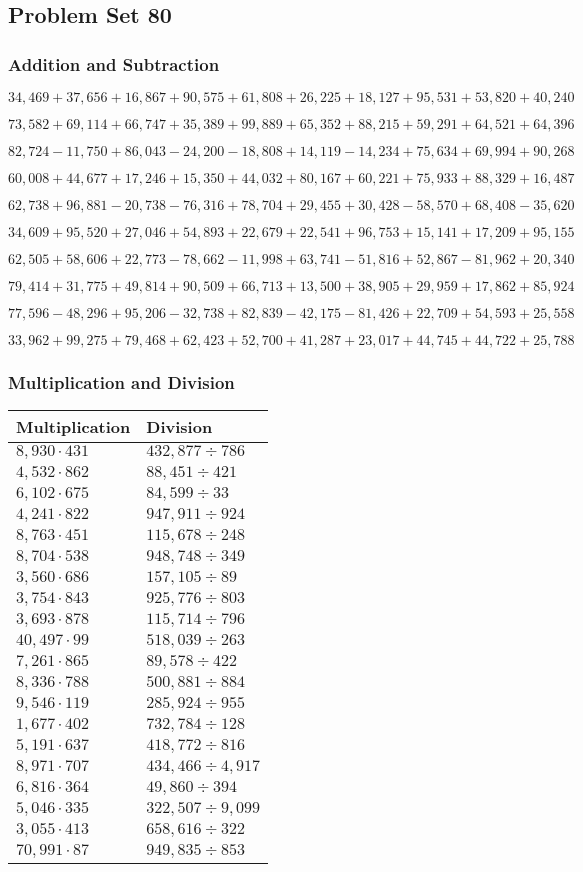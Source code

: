 \hypertarget{problem-set-80}{%
\subsection{Problem Set 80}\label{problem-set-80}}

\hypertarget{addition-and-subtraction-302}{%
\subsubsection{Addition and
Subtraction}\label{addition-and-subtraction-302}}

\(34,469+37,656+16,867+90,575+61,808+26,225+18,127+95,531+53,820+ 40,240\)

\(73,582+69,114+66,747+35,389+99,889+65,352+88,215+59,291+64,521+64,396\)

\(82,724-11,750+86,043-24,200-18,808+14,119-14,234+75,634+69,994+90,268\)

\(60,008+44,677+17,246+15,350+44,032+80,167+60,221+75,933+88,329+16,487\)

\(62,738+96,881-20,738-76,316+78,704+29,455+30,428-58,570+68,408-35,620\)

\(34,609+95,520+27,046+54,893+22,679+22,541+96,753+15,141+17,209+95,155\)

\(62,505+58,606+22,773-78,662-11,998+63,741-51,816+52,867-81,962+20,340\)

\(79,414+31,775+49,814+90,509+66,713+13,500+38,905+29,959+17,862+85,924\)

\(77,596-48,296+95,206-32,738+82,839-42,175-81,426+22,709+54,593+25,558\)

\(33,962+99,275+79,468+62,423+52,700+41,287+23,017+44,745+44,722+25,788\)

\hypertarget{multiplication-and-division-301}{%
\subsubsection{Multiplication and
Division}\label{multiplication-and-division-301}}

\begin{longtable}[]{@{}ll@{}}
\toprule
Multiplication & Division\tabularnewline
\midrule
\endhead
\(8,930\cdot431\) & \(432,877÷786\)\tabularnewline
\(4,532\cdot862\) & \(88,451÷421\)\tabularnewline
\(6,102\cdot675\) & \(84,599÷33\)\tabularnewline
\(4,241\cdot822\) & \(947,911÷924\)\tabularnewline
\(8,763\cdot451\) & \(115,678÷248\)\tabularnewline
\(8,704\cdot538\) & \(948,748÷349\)\tabularnewline
\(3,560\cdot686\) & \(157,105÷89\)\tabularnewline
\(3,754\cdot843\) & \(925,776÷803\)\tabularnewline
\(3,693\cdot878\) & \(115,714÷796\)\tabularnewline
\(40,497\cdot99\) & \(518,039÷263\)\tabularnewline
\(7,261\cdot865\) & \(89,578÷422\)\tabularnewline
\(8,336\cdot788\) & \(500,881÷884\)\tabularnewline
\(9,546\cdot119\) & \(285,924÷955\)\tabularnewline
\(1,677\cdot402\) & \(732,784÷128\)\tabularnewline
\(5,191\cdot637\) & \(418,772÷816\)\tabularnewline
\(8,971\cdot707\) & \(434,466÷4,917\)\tabularnewline
\(6,816\cdot364\) & \(49,860÷394\)\tabularnewline
\(5,046\cdot335\) & \(322,507÷9,099\)\tabularnewline
\(3,055\cdot413\) & \(658,616÷322\)\tabularnewline
\(70,991\cdot87\) & \(949,835÷853\)\tabularnewline
\bottomrule
\end{longtable}


